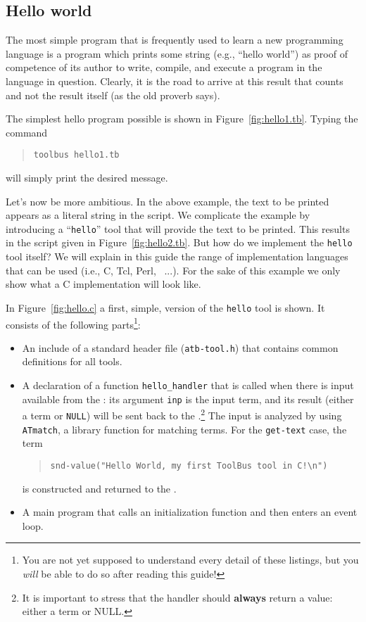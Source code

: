 \documentclass[a4,twoside,noweb]{article} %
\begin{document}
\subsection{\label{Hello}Hello world}
The most simple program that is frequently used to learn a new
programming language is a program which prints some string (e.g.,
``hello world'') as proof of competence of its author to write,
compile, and execute a program in the language in question.  Clearly,
it is the road to arrive at this result that counts and not the result
itself (as the old proverb says).

The simplest hello program possible is shown in Figure~\ref{fig:hello1.tb}.
Typing the command
\begin{quote}
{\tt toolbus hello1.tb}
\end{quote}
will simply print the desired message.



Let's now be more ambitious. In the above example, the text to be printed
appears as a literal string in the script. We complicate the example
by introducing a ``{\tt hello}'' tool that will provide the text to be printed.
This results in the script given in Figure~\ref{fig:hello2.tb}.
But how do we implement the {\tt hello} tool itself?
We will explain in this guide the range of implementation languages that 
can be used (i.e., C, Tcl, Perl, \ASFSDF\ ...).
For the sake of this example we only show what a C implementation will look like.

In Figure~\ref{fig:hello.c} a first, simple, version of the {\tt hello} tool
is shown. It consists of the following parts\footnote{
You are not yet supposed to understand every detail of these
listings, but you {\em will} be able to do so after reading this guide!}:
\begin{itemize}
\item An include of a standard header file ({\tt atb-tool.h}) that contains
common definitions for all tools.
\item A declaration of a function {\tt hello\_handler} that is called when there is
input available from the \TB:
its argument {\tt inp} is the input term, and its result (either a term
or {\tt NULL}) will be sent back to the \TB.\footnote{It is important
to stress that the handler should {\bf always} return a value: 
either a term or NULL.}
The input is analyzed by using {\tt ATmatch}, a library function for matching
terms. For the {\tt get-text} case, 
the term
\begin{quote}
\verb+snd-value("Hello World, my first ToolBus tool in C!\n")+
\end{quote}
is constructed and returned to the \TB.

\item A main program that calls an initialization function and
then enters an event loop.

\end{itemize}
\end{document}
